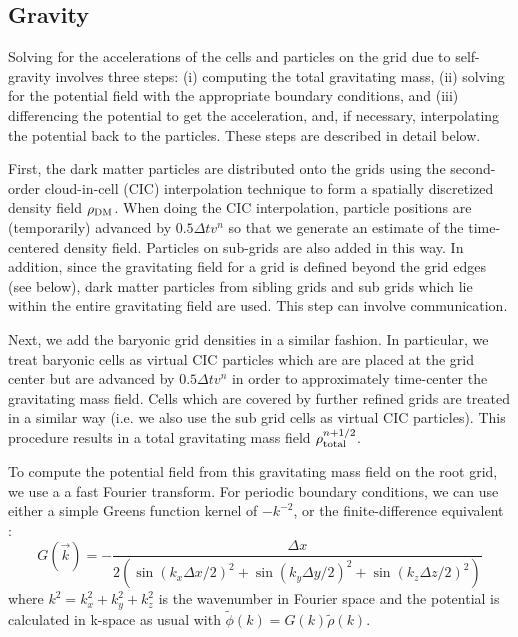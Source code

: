 \subsection{Gravity}
\label{sec.gravity}

Solving for the accelerations of the cells and particles on the grid due to self-gravity involves three steps: (i) computing the total gravitating mass, (ii) solving for the potential field with the appropriate boundary conditions, and (iii) differencing the potential to get the acceleration, and, if necessary, interpolating the potential back to the particles. These steps are described in detail below.

First, the dark matter particles are distributed onto the grids using the second-order cloud-in-cell (CIC) interpolation technique \citet{Hockney88} to form a spatially discretized density field $\rho_{\rm DM}$.  When doing the CIC interpolation, particle positions are (temporarily) advanced by $0.5 \Delta t v^n$ so that we generate an estimate of the time-centered density field.  Particles on sub-grids are also added in this way.  In addition, since the gravitating field for a grid is defined beyond the grid edges (see below), dark matter particles from sibling grids and sub grids which lie within the entire gravitating field are used.  This step can involve communication.

Next, we add the baryonic grid densities in a similar fashion.  In particular, we treat baryonic cells as virtual CIC particles which are are placed at the grid center but are advanced by $0.5 \Delta t v^n$ in order to approximately time-center the gravitating mass field.  Cells which are covered by further refined grids are treated in a similar way (i.e. we also use the sub grid cells as virtual CIC particles).  This procedure results in a total gravitating mass field $\rho_{\rm total}^{n+1/2}$.

To compute the potential field from this gravitating mass field on the root grid, we use a a fast Fourier transform. For periodic boundary conditions, we can use either a simple Greens function kernel of $-k^{-2}$, or the finite-difference equivalent \citep{Hockney88}:
\begin{equation}
G(\vec{k}) = - \frac{\Delta x}{2 \left( \sin(k_x \Delta x/2)^2 + \sin(k_y \Delta y/2)^2 + \sin(k_z \Delta z/2)^2 \right) }
\end{equation}
where $k^2 = k_x^2 + k_y^2 + k_z^2$ is the wavenumber in Fourier space and the potential is calculated in k-space as usual with $\tilde{\phi}(k) = G(k) \tilde{\rho}(k)$.  

